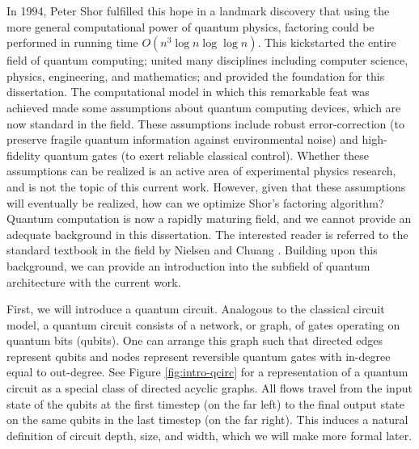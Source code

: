 In 1994, Peter Shor fulfilled this hope in a landmark
discovery that using the more general computational power of quantum physics,
factoring could be performed in running time $O(n^3\log n \log\log n)$\cite{Shor1994}. 
This kickstarted the entire field of quantum computing; united many
disciplines including computer science, physics, engineering, and
mathematics; and provided the foundation for this dissertation.
The computational model in which this remarkable feat was achieved
made some assumptions about quantum computing devices, which are now
standard in the field.
These assumptions include robust error-correction (to preserve fragile
quantum information against environmental noise) and high-fidelity
quantum gates (to exert reliable classical control).
Whether these assumptions can be
realized is an active area of experimental physics research, and is not the
topic of this current work. However, given that these assumptions will
eventually be realized, how can we optimize Shor's factoring algorithm?
Quantum computation is now a rapidly maturing field, and we cannot provide
an adequate background in this dissertation. The interested reader is referred
to the standard textbook in the field by Nielsen and Chuang \cite{Nielsen2000}.
Building upon this background, we can provide an introduction into the subfield
of quantum architecture with the current work.

First, we will introduce a quantum circuit.
Analogous to the classical circuit model, a quantum circuit consists of
a network, or graph, of gates operating on quantum bits (qubits). One can
arrange this graph such that directed edges represent qubits and
nodes represent reversible quantum gates with in-degree equal to out-degree.
See Figure \ref{fig:intro-qcirc} for a representation of a quantum circuit
as a special class of directed
acyclic graphs. All flows travel from the input state of the qubits at the
first timestep (on the far
left) to the final output state on the same qubits in the last timestep
(on the far right). This induces a natural definition of circuit depth,
size, and width, which we will make more formal later.

